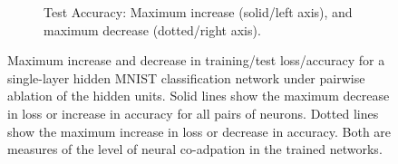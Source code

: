 \documentclass[thesis]{subfiles}
\begin{document}
\begin{figure}[tbp]
\begin{subfigure}[b]{\linewidth}
\caption{Test Accuracy: Maximum increase (solid/left axis), and maximum decrease (dotted/right axis).}
\label{fig:mnist_ablation_test_acc}
\end{subfigure}
\caption[Pairwise filter ablation for MNIST]{Maximum increase and decrease in training/test loss/accuracy for a single-layer hidden MNIST classification network under pairwise ablation of the hidden units. Solid lines show the maximum decrease in loss or increase in accuracy for all pairs of neurons. Dotted lines show the maximum increase in loss or decrease in accuracy. Both are measures of the level of neural co-adpation in the trained networks.}\label{fig:mnist_ablation}
\end{figure}
\end{document}

